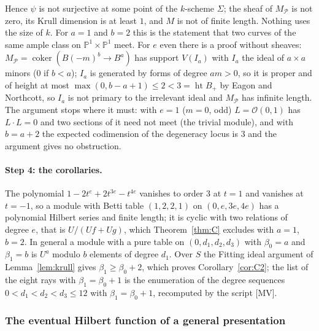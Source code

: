 \documentclass[11pt]{article}
\theoremstyle{definition}
\theoremstyle{remark}
\begin{document}
Hence $\psi$ is not surjective at some point of the $k$-scheme $\Sigma$; the sheaf of $M_{\mathcal P}$ is not zero, its Krull dimension is at least $1$, and $M$ is not of finite length. Nothing uses the size of $k$. For $a=1$ and $b=2$ this is the statement that two curves of the same ample class on $\mathbb P^1\times\mathbb P^1$ meet. For $e$ even there is a proof without sheaves: $M_{\mathcal P}=\operatorname{coker}(B(-m)^b\to B^a)$ has support $V(I_a)$ with $I_a$ the ideal of $a\times a$ minors ($0$ if $b<a$); $I_a$ is generated by forms of degree $am>0$, so it is proper and of height at most $\max(0,b-a+1)\le2<3=\operatorname{ht}B_+$ by Eagon and Northcott, so $I_a$ is not primary to the irrelevant ideal and $M_{\mathcal P}$ has infinite length. The argument stops where it must: with $e=1$ ($m=0$, odd) $L=\mathcal O(0,1)$ has $L\cdot L=0$ and two sections of it need not meet (the trivial module), and with $b=a+2$ the expected codimension of the degeneracy locus is $3$ and the argument gives no obstruction.

\paragraph{Step 4: the corollaries.} The polynomial $1-2t^e+2t^{3e}-t^{4e}$ vanishes to order $3$ at $t=1$ and vanishes at $t=-1$, so a module with Betti table $(1,2,2,1)$ on $(0,e,3e,4e)$ has a polynomial Hilbert series and finite length; it is cyclic with two relations of degree $e$, that is $U/(Uf+Ug)$, which Theorem~\ref{thm:C} excludes with $a=1$, $b=2$. In general a module with a pure table on $(0,d_1,d_2,d_3)$ with $\beta_0=a$ and $\beta_1=b$ is $U^a$ modulo $b$ elements of degree $d_1$. Over $S$ the Fitting ideal argument of Lemma~\ref{lem:krull} gives $\beta_1\ge\beta_0+2$, which proves Corollary~\ref{cor:C2}; the list of the eight rays with $\beta_1=\beta_0+1$ is the enumeration of the degree sequences $0<d_1<d_2<d_3\le12$ with $\beta_1=\beta_0+1$, recomputed by the script [MV].

\subsubsection*{The eventual Hilbert function of a general presentation}
\end{document}
